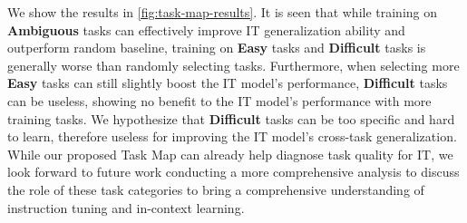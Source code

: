 We show the results in \autoref{fig:task-map-results}. It is seen that while training on \textbf{Ambiguous} tasks can effectively improve IT generalization ability and outperform random baseline, training on \textbf{Easy} tasks and \textbf{Difficult} tasks is generally worse than randomly selecting tasks. Furthermore, when selecting more \textbf{Easy} tasks can still slightly boost the IT model's performance, \textbf{Difficult} tasks can be useless, showing no benefit to the IT model's performance with more training tasks. We hypothesize that \textbf{Difficult} tasks can be too specific and hard to learn, therefore useless for improving the IT model's cross-task generalization.
While our proposed Task Map can already help diagnose task quality for IT, we look forward to future work conducting a more comprehensive analysis to discuss the role of these task categories to bring a comprehensive understanding of instruction tuning and in-context learning.
